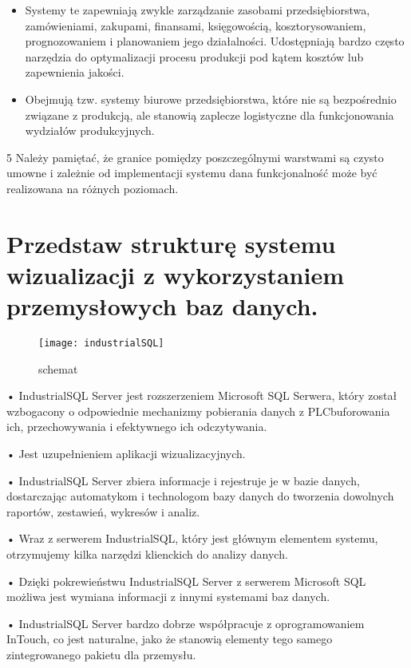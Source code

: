 \documentclass{article}
\begin{document}
       	\begin{itemize}
       	\item Systemy te zapewniają zwykle zarządzanie zasobami przedsiębiorstwa,
       	zamówieniami, zakupami, finansami, księgowością, kosztorysowaniem,
       	prognozowaniem i planowaniem jego działalności. Udostępniają bardzo często
       	narzędzia do optymalizacji procesu produkcji pod kątem kosztów lub
       	zapewnienia jakości.
       	\item Obejmują tzw. systemy biurowe przedsiębiorstwa, które nie są bezpośrednio
       	związane z produkcją, ale stanowią zaplecze logistyczne dla funkcjonowania
       	wydziałów produkcyjnych.
       	       	\end{itemize}5
       	Należy pamiętać, że granice pomiędzy poszczególnymi warstwami są czysto
       	umowne i zależnie od implementacji systemu dana funkcjonalność może być
       	realizowana na różnych poziomach.
       	
	\section{Przedstaw strukturę systemu wizualizacji z wykorzystaniem przemysłowych baz	danych.}
	\begin{figure}[!htb]
		\centering
		\texttt{[image: industrialSQL]}
		\caption{schemat}
		\label{fig:industrialsql}
	\end{figure}
	
	• IndustrialSQL Server jest rozszerzeniem Microsoft SQL Serwera, który
	został wzbogacony o odpowiednie mechanizmy pobierania danych z PLCbuforowania ich, przechowywania i efektywnego ich odczytywania.
	
	• Jest uzupełnieniem aplikacji wizualizacyjnych.
	
	• IndustrialSQL Server zbiera informacje i rejestruje je w bazie danych,
	dostarczając automatykom i technologom bazy danych do tworzenia
	dowolnych raportów, zestawień, wykresów i analiz.
	
	• Wraz z serwerem IndustrialSQL, który jest głównym elementem
	systemu, otrzymujemy kilka narzędzi klienckich do analizy danych.
	
	• Dzięki pokrewieństwu IndustrialSQL Server z serwerem Microsoft SQL
	możliwa jest wymiana informacji z innymi systemami baz danych.
	
	• IndustrialSQL Server bardzo dobrze współpracuje z oprogramowaniem
	InTouch, co jest naturalne, jako że stanowią elementy tego samego
	zintegrowanego pakietu dla przemysłu.
	
\end{document}
